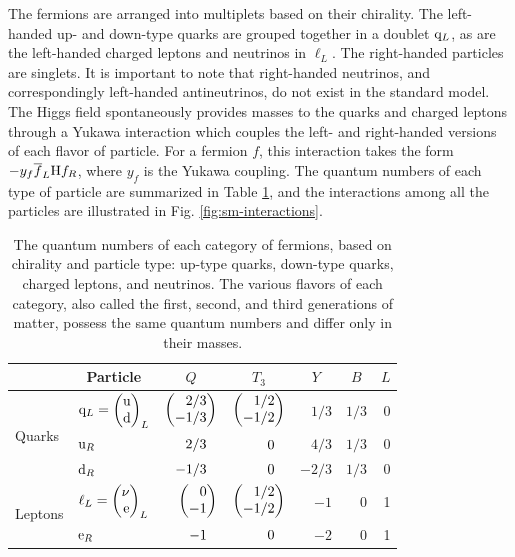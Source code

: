 The fermions are arranged into multiplets based on their chirality. The left-handed up- and down-type quarks are grouped together in a doublet $\mathrm{q}_L$, as are the left-handed charged leptons and neutrinos in $\ell_L$. The right-handed particles are singlets. It is important to note that right-handed neutrinos, and correspondingly left-handed antineutrinos, do not exist in the standard model. The Higgs field spontaneously provides masses to the quarks and charged leptons through a Yukawa interaction which couples the left- and right-handed versions of each flavor of particle. For a fermion $f$, this interaction takes the form $-y_{f} \overline{f}_{L} \mathrm{H} f_{R}$, where $y_{f}$ is the Yukawa coupling. The quantum numbers of each type of particle are summarized in Table \ref{tab:q-num}, and the interactions among all the particles are illustrated in Fig. \ref{fig:sm-interactions}.

\begin{table}[htb]
  \begin{center}
    \begin{tabular}{|l||l|r|r|r|r|r|}
\hline
      & \multicolumn{1}{c|}{Particle} & \multicolumn{1}{c|}{$Q$} & \multicolumn{1}{c|}{$T_3$} & \multicolumn{1}{c|}{$Y$} & \multicolumn{1}{c|}{$B$} & \multicolumn{1}{c|}{$L$} \\
\hline
\hline
\multirow{3}{*}{Quarks}  
\rule{0pt}{24pt}         & $\cPq_L = \doublet[r]{\cPqu}{\cPqd}_L$ & $\doublet[r]{2/3}{-1/3}$ & $\doublet[r]{1/2}{-1/2}$ & $1/3$  & $1/3$ & 0 \\
                         & $\mathrm{u}_R$                              & $2/3\hphantom{\bigg)}$   & $0\hphantom{\bigg)}$     & $4/3$  & $1/3$ & 0 \\
                         & $\mathrm{d}_R$                              & $-1/3\hphantom{\bigg)}$  & $0\hphantom{\bigg)}$     & $-2/3$ & $1/3$ & 0 \\
\hline
\hline
\multirow{2}{*}{Leptons} 
\rule{0pt}{24pt}         & $\ell_L = \doublet[r]{\nu}{\Pe}_L$     & $\doublet[r]{0}{-1}$     & $\doublet[r]{1/2}{-1/2}$ & $-1$   & 0     & 1 \\
                         & $\mathrm{e}_R$                                & $-1\hphantom{\bigg)}$    & $0\hphantom{\bigg)}$     & $-2$   & 0     & 1 \\
\hline
    \end{tabular}
    \caption{The quantum numbers of each category of fermions, based on chirality and particle type: up-type quarks, down-type quarks, charged leptons, and neutrinos. The various flavors of each category, also called the first, second, and third generations of matter, possess the same quantum numbers and differ only in their masses.}
    \label{tab:q-num}
  \end{center}
\end{table}

